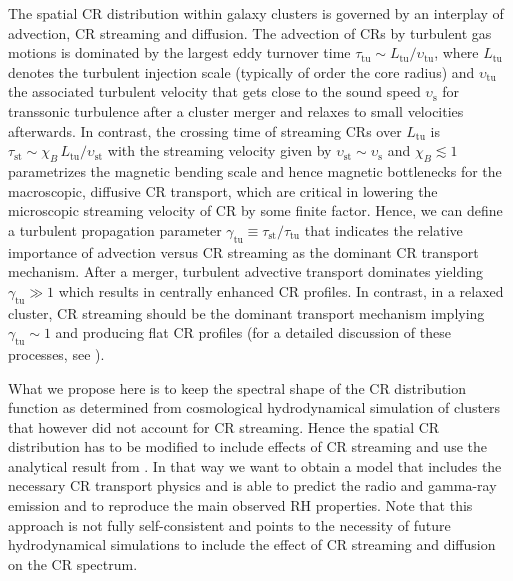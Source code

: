 \documentclass[traditabstract]{aa}
\newcommand{\rmn}{\mathrm}
\newcommand{\vel}{\upsilon}
\begin{document}
The spatial CR distribution within galaxy clusters is governed by an interplay
of advection, CR streaming and diffusion. The advection of CRs by turbulent gas
motions is dominated by the largest eddy turnover time $\tau_{\rmn{tu}}\sim
L_{\rmn{tu}}/ \vel_{\rmn{tu}}$, where $L_{\rmn{tu}}$ denotes the turbulent
injection scale (typically of order the core radius) and $\vel_{\rmn{tu}}$ the
associated turbulent velocity that gets close to the sound speed
$\vel_{\rmn{s}}$ for transsonic turbulence after a cluster merger and relaxes to
small velocities afterwards. In contrast, the crossing time of streaming CRs
over $L_{\rmn{tu}}$ is $\tau_{\rmn{st}}\sim \chi_B\,L_{\rmn{tu}}/
\vel_{\rmn{st}}$ with the streaming velocity given by $\vel_{\rmn{st}}\sim
\vel_{\rmn{s}}$ and $\chi_B\lesssim 1$ parametrizes the magnetic bending scale
and hence magnetic bottlenecks for the macroscopic, diffusive CR transport,
which are critical in lowering the microscopic streaming velocity of CR by some
finite factor. Hence, we can define a turbulent propagation parameter
$\gamma_{\rmn{tu}}\equiv \tau_{\rmn{st}}/\tau_{\rmn{tu}}$ that indicates the
relative importance of advection versus CR streaming as the dominant CR
transport mechanism. After a merger, turbulent advective transport dominates
yielding $\gamma_{\rmn{tu}}\gg 1$ which results in centrally enhanced CR
profiles. In contrast, in a relaxed cluster, CR streaming should be the dominant
transport mechanism implying $\gamma_{\rmn{tu}}\sim1$ and producing flat CR
profiles (for a detailed discussion of these processes, see
\citet{2011A&A...527A..99E}).

What we propose here is to keep the spectral shape of the CR distribution
function as determined from cosmological hydrodynamical simulation of clusters
\citep{2010MNRAS.409..449P} that however did not account for CR streaming. Hence
the spatial CR distribution has to be modified to include effects of CR
streaming and use the analytical result from \citet{2011A&A...527A..99E}. In
that way we want to obtain a model that includes the necessary CR transport
physics and is able to predict the radio and gamma-ray emission and to reproduce
the main observed RH properties.  Note that this approach is not fully
self-consistent and points to the necessity of future hydrodynamical simulations
to include the effect of CR streaming and diffusion on the CR spectrum.
\end{document}
